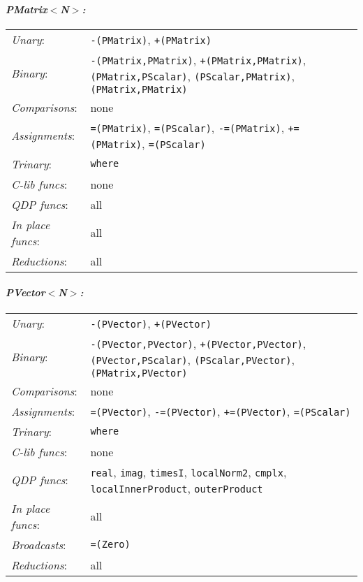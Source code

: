 \documentclass[12pt,letterpaper]{article}
\begin{document}
\paragraph{\bf\em PMatrix$<$N$>$:}
\begin{flushleft}
  \begin{tabular}{lp{5.0in}}
  {\em Unary}:& {\tt -(PMatrix)}, {\tt +(PMatrix)}\\
  {\em Binary}:& {\tt -(PMatrix,PMatrix)}, {\tt +(PMatrix,PMatrix)}, 
       {\tt *(PMatrix,PScalar)}, {\tt *(PScalar,PMatrix)}, {\tt *(PMatrix,PMatrix)}\\
  {\em Comparisons}:& none\\
  {\em Assignments}:& {\tt =(PMatrix)}, {\tt =(PScalar)}, {\tt -=(PMatrix)}, 
       {\tt +=(PMatrix)}, {\tt *=(PScalar)}\\
  {\em Trinary}:& {\tt where}\\
  {\em C-lib funcs}:& none\\
  {\em QDP funcs}:& all\\
  {\em In place funcs}:& all\\
  {\em Reductions}:& all\\
  \end{tabular}
\end{flushleft}

\paragraph{\bf\em PVector$<$N$>$:}
\begin{flushleft}
  \begin{tabular}{lp{5.0in}}
  {\em Unary}:& {\tt -(PVector)}, {\tt +(PVector)}\\
  {\em Binary}:& {\tt -(PVector,PVector)}, {\tt +(PVector,PVector)}, 
       {\tt *(PVector,PScalar)}, {\tt *(PScalar,PVector)}, {\tt *(PMatrix,PVector)}\\
  {\em Comparisons}:& none\\
  {\em Assignments}:& {\tt =(PVector)}, {\tt -=(PVector)}, {\tt +=(PVector)}, 
       {\tt *=(PScalar)}\\
  {\em Trinary}:& {\tt where}\\
  {\em C-lib funcs}:& none\\
  {\em QDP funcs}:& {\tt real}, {\tt imag}, {\tt timesI}, 
        {\tt localNorm2}, {\tt cmplx}, {\tt localInnerProduct}, {\tt outerProduct}\\
  {\em In place funcs}:& all\\
  {\em Broadcasts}:& {\tt =(Zero)}\\
  {\em Reductions}:& all\\
  \end{tabular}
\end{flushleft}
\end{document}
